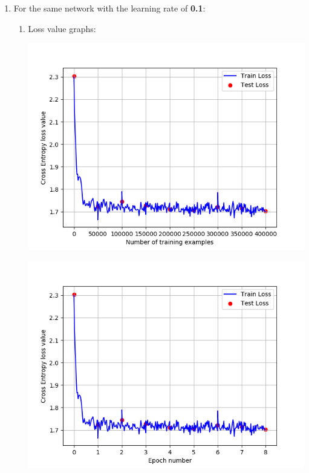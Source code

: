 \documentclass[a4paper]{iacas}
\begin{document}
\begin{enumerate}
\item For the same network with the learning rate of \textbf{0.1}:
\begin{enumerate}
\item Loss value graphs:

\vskip 0.1in
\begin{minipage}{\linewidth}
	\includegraphics[scale=0.8]{hw2_py/results/_14_01_43/lr_0_1_net_1_CE_/loss_value.png}
	\label{fig_5}
\end{minipage}
\vskip 0.1in
\begin{minipage}{\linewidth}
	\includegraphics[scale=0.8]{hw2_py/results/_14_01_43/lr_0_1_net_1_CE_/loss_value_epoch.png}
	\label{fig_6}
\end{minipage}
\vskip 0.1in


\end{enumerate}
\end{enumerate}
\end{document}

